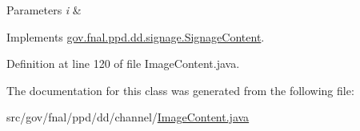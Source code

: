 \begin{DoxyParams}{Parameters}
{\em i} & \\
\hline
\end{DoxyParams}


Implements \hyperlink{interfacegov_1_1fnal_1_1ppd_1_1dd_1_1signage_1_1SignageContent_a59c75e24dcec3ea729297104328a7852}{gov.\-fnal.\-ppd.\-dd.\-signage.\-Signage\-Content}.



Definition at line 120 of file Image\-Content.\-java.



The documentation for this class was generated from the following file\-:\begin{DoxyCompactItemize}
\item 
src/gov/fnal/ppd/dd/channel/\hyperlink{ImageContent_8java}{Image\-Content.\-java}\end{DoxyCompactItemize}

